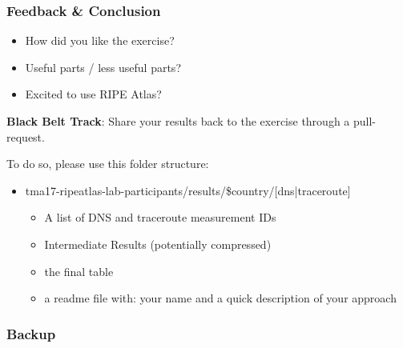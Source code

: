 \begin{frame}
\frametitle{Feedback \& Conclusion}
\begin{itemize}
	\item How did you like the exercise?
	\item Useful parts / less useful parts?
	\item Excited to use RIPE Atlas? \smiley{}
\end{itemize}
\vspace{10mm}
\textbf{Black Belt Track}: Share your results back to the exercise through a pull-request. 

To do so, please use this folder structure:
\begin{itemize}
	\item tma17-ripeatlas-lab-participants/results/\$country/[dns|traceroute]
	\begin{itemize}
		\item A list of DNS and traceroute measurement IDs
		\item Intermediate Results (potentially compressed)
		\item the final table
		\item a readme file with: your name and a quick description of your approach
	\end{itemize}
\end{itemize}

\end{frame}
\clearpage



\begin{frame}
\frametitle{Backup}
\end{frame}
\clearpage


